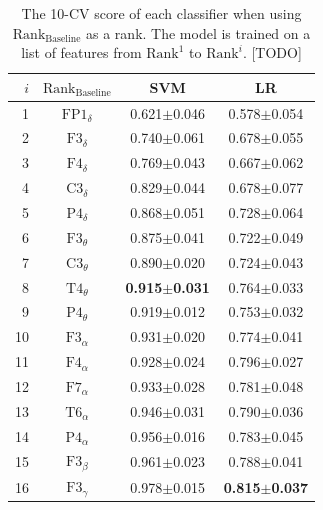 \documentclass[pdflatex,sn-mathphys]{sn-jnl}%
\theoremstyle{thmstyleone}%
\theoremstyle{thmstyletwo}%
\theoremstyle{thmstylethree}%
\begin{document}
\begin{table}[h!]
\centering
\caption{The 10-CV score of each classifier when using $\text{Rank}_{\text{Baseline}}$ as a rank. The model is trained on a list of features from $\text{Rank}^1$ to $\text{Rank}^i$. [TODO]}
\label{tab:cv_baseline}
\begin{tabular}{r|ccc}
\hline
 $i$ & $\text{Rank}_{\text{Baseline}}$ &                      SVM &                       LR \\
\hline
   1 &           $\text{FP1}_{\delta}$ &          0.621$\pm$0.046 &          0.578$\pm$0.054 \\
   2 &            $\text{F3}_{\delta}$ &          0.740$\pm$0.061 &          0.678$\pm$0.055 \\
   3 &            $\text{F4}_{\delta}$ &          0.769$\pm$0.043 &          0.667$\pm$0.062 \\
   4 &            $\text{C3}_{\delta}$ &          0.829$\pm$0.044 &          0.678$\pm$0.077 \\
   5 &            $\text{P4}_{\delta}$ &          0.868$\pm$0.051 &          0.728$\pm$0.064 \\
   6 &            $\text{F3}_{\theta}$ &          0.875$\pm$0.041 &          0.722$\pm$0.049 \\
   7 &            $\text{C3}_{\theta}$ &          0.890$\pm$0.020 &          0.724$\pm$0.043 \\
   8 &            $\text{T4}_{\theta}$ & \textbf{0.915$\pm$0.031} &          0.764$\pm$0.033 \\
   9 &            $\text{P4}_{\theta}$ &          0.919$\pm$0.012 &          0.753$\pm$0.032 \\
  10 &            $\text{F3}_{\alpha}$ &          0.931$\pm$0.020 &          0.774$\pm$0.041 \\
  11 &            $\text{F4}_{\alpha}$ &          0.928$\pm$0.024 &          0.796$\pm$0.027 \\
  12 &            $\text{F7}_{\alpha}$ &          0.933$\pm$0.028 &          0.781$\pm$0.048 \\
  13 &            $\text{T6}_{\alpha}$ &          0.946$\pm$0.031 &          0.790$\pm$0.036 \\
  14 &            $\text{P4}_{\alpha}$ &          0.956$\pm$0.016 &          0.783$\pm$0.045 \\
  15 &             $\text{F3}_{\beta}$ &          0.961$\pm$0.023 &          0.788$\pm$0.041 \\
  16 &            $\text{F3}_{\gamma}$ &          0.978$\pm$0.015 & \textbf{0.815$\pm$0.037} \\

\end{tabular}
\end{table}
\end{document}
